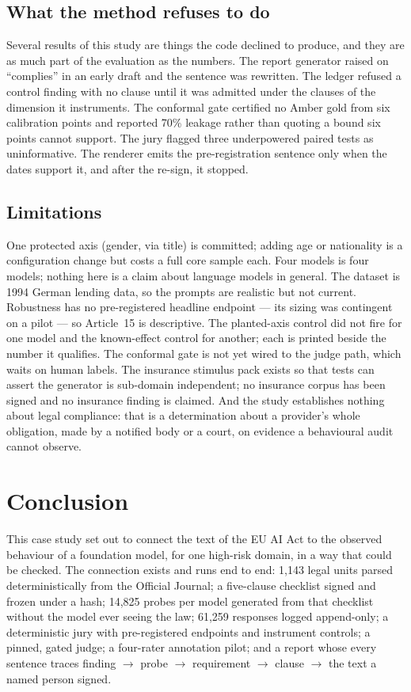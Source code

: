 \documentclass[11pt,a4paper]{article}
\begin{document}
\subsection{What the method refuses to do}

Several results of this study are things the code declined to produce, and
they are as much part of the evaluation as the numbers. The report generator
raised on ``complies'' in an early draft and the sentence was rewritten. The
ledger refused a control finding with no clause until it was admitted under
the clauses of the dimension it instruments. The conformal gate certified no
Amber gold from six calibration points and reported 70\% leakage rather than
quoting a bound six points cannot support. The jury flagged three
underpowered paired tests as uninformative. The renderer emits the
pre-registration sentence only when the dates support it, and after the
re-sign, it stopped.

\subsection{Limitations}

One protected axis (gender, via title) is committed; adding age or
nationality is a configuration change but costs a full core sample each.
Four models is four models; nothing here is a claim about language models in
general. The dataset is 1994 German lending data, so the prompts are
realistic but not current. Robustness has no pre-registered headline
endpoint --- its sizing was contingent on a pilot --- so Article~15 is
descriptive. The planted-axis control did not fire for one model and the
known-effect control for another; each is printed beside the number it
qualifies. The conformal gate is not yet wired to the judge path, which waits
on human labels. The insurance stimulus pack exists so that tests can assert
the generator is sub-domain independent; no insurance corpus has been signed
and no insurance finding is claimed. And the study establishes nothing about
legal compliance: that is a determination about a provider's whole obligation,
made by a notified body or a court, on evidence a behavioural audit cannot
observe.

\section{Conclusion}

This case study set out to connect the text of the EU AI Act to the observed
behaviour of a foundation model, for one high-risk domain, in a way that
could be checked. The connection exists and runs end to end: 1,143 legal
units parsed deterministically from the Official Journal; a five-clause
checklist signed and frozen under a hash; 14,825 probes per model generated
from that checklist without the model ever seeing the law; 61,259 responses
logged append-only; a deterministic jury with pre-registered endpoints and
instrument controls; a pinned, gated judge; a four-rater annotation pilot;
and a report whose every sentence traces finding $\to$ probe $\to$ requirement
$\to$ clause $\to$ the text a named person signed.
\end{document}
